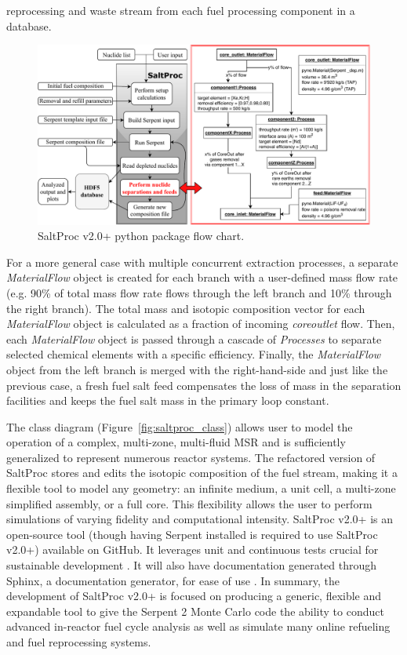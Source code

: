 \documentclass[12pt]{article} %
\begin{document}
reprocessing and waste stream from each fuel processing component in a 
database. 
\begin{figure}[ht!] %
	\centering
  \includegraphics[width=1.03\textwidth]{saltproc_flowchart.pdf}
  	  	\vspace{-0.35in}
  \caption{SaltProc v2.0+ python package flow chart.}
  \label{fig:saltproc_flow}
\end{figure}

For a more general case with multiple concurrent extraction processes, a 
separate \textit{MaterialFlow} object is created for each branch with a 
user-defined mass flow rate (e.g. 90\% of total mass flow rate flows through 
the left branch and 10\% through the right branch). The total mass and  
isotopic composition vector for each \textit{MaterialFlow} object is 
calculated as a fraction of incoming \textit{core\textunderscore outlet} flow. 
Then, each \textit{MaterialFlow} object is passed through a cascade of 
\textit{Processes} to separate selected chemical elements with a specific 
efficiency. Finally, the \textit{MaterialFlow} object from the left branch is  
merged with the right-hand-side and just like the previous case, a fresh 
fuel salt feed compensates the loss of mass in the separation facilities and 
keeps the fuel salt mass in the primary loop constant.

The class diagram (Figure~\ref{fig:saltproc_class}) allows user to model the 
operation of a complex, multi-zone, multi-fluid \gls{MSR} and is sufficiently 
generalized to represent numerous reactor systems. The refactored version of 
SaltProc stores and edits the isotopic composition of the fuel stream, making  
it a flexible tool to model any geometry: an infinite medium, a unit cell, a 
multi-zone simplified assembly, or a full core. This flexibility allows the 
user to perform simulations of varying fidelity and computational 
intensity. SaltProc v2.0+ is an open-source tool (though having Serpent 
installed is required to use SaltProc v2.0+) available on GitHub. It leverages 
unit and continuous tests crucial for sustainable development 
\cite{krekel_pytest_2004}. It will also have documentation generated through 
Sphinx, a documentation generator, for ease of use \cite{brandl_sphinx_2009}. 
In summary, the development of SaltProc v2.0+ is focused on producing a 
generic, flexible and expandable tool to give the Serpent 2 Monte Carlo code 
the ability to conduct advanced in-reactor fuel cycle analysis as well as 
simulate many online refueling and fuel reprocessing systems.
\end{document}
